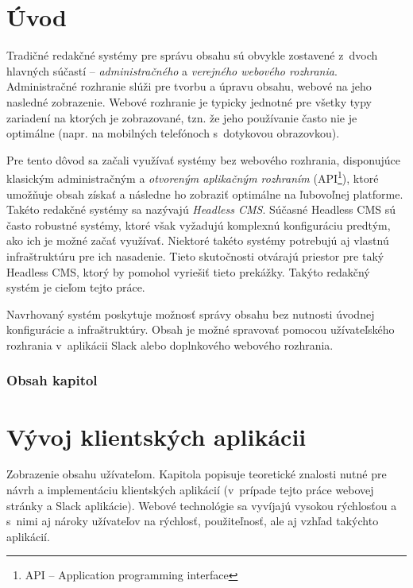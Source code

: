 \chapter{Úvod}
Tradičné redakčné systémy pre správu obsahu sú obvykle zostavené z~dvoch hlavných súčastí -- \emph{administračného} a \emph{verejného webového rozhrania}. Administračné rozhranie slúži pre tvorbu a úpravu obsahu, webové na jeho nasledné zobrazenie. Webové rozhranie je typicky jednotné pre všetky typy zariadení na ktorých je zobrazované, tzn. že jeho používanie často nie je optimálne (napr. na mobilných telefónoch s~dotykovou obrazovkou).

Pre tento dôvod sa začali využívať systémy bez webového rozhrania, disponujúce klasickým administračným a \emph{otvoreným aplikačným rozhraním} (API\footnote{API -- Application programming interface}), ktoré umožňuje obsah získať a následne ho zobraziť optimálne na ľubovoľnej platforme. Takéto redakčné systémy sa nazývajú \emph{Headless CMS}. Súčasné Headless CMS sú často robustné systémy, ktoré však vyžadujú komplexnú konfiguráciu predtým, ako ich je možné začať využívať. Niektoré takéto systémy potrebujú aj vlastnú infraštruktúru pre ich nasadenie. Tieto skutočnosti otvárajú priestor pre taký Headless CMS, ktorý by pomohol vyriešiť tieto prekážky. Takýto redakčný systém je cieľom tejto práce.

Navrhovaný systém poskytuje možnosť správy obsahu bez nutnosti úvodnej konfigurácie a infraštruktúry. Obsah je možné spravovať pomocou užívateľského rozhrania v~aplikácii Slack alebo doplnkového webového rozhrania.

\subsection*{Obsah kapitol}

\chapter{Vývoj klientských aplikácii}
\label{theory:client_dev}
Zobrazenie obsahu užívateľom. Kapitola popisuje teoretické znalosti nutné pre návrh a implementáciu klientských aplikácií (v~prípade tejto práce webovej stránky a Slack aplikácie). Webové technológie sa vyvíjajú vysokou rýchlosťou a s~nimi aj nároky užívateľov na rýchlosť, použiteľnosť, ale aj vzhľad takýchto aplikácií.

